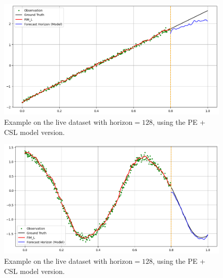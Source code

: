 \documentclass{article}
\theoremstyle{plain}
\theoremstyle{definition}
\theoremstyle{remark}
\begin{document}
\begin{figure}[h!]
    \centering
    \includegraphics[width=\linewidth]{assets/test4.png}
    \caption{Example on the live dataset with $\text{horizon}=128$, using the PE + CSL model version.
    }\label{fig:test4}
\end{figure}
\begin{figure}[h!]
    \centering
    \includegraphics[width=\linewidth]{assets/test5.png}
    \caption{Example on the live dataset with $\text{horizon}=128$, using the PE + CSL model version.
    }\label{fig:test5}
\end{figure}
\end{document}

